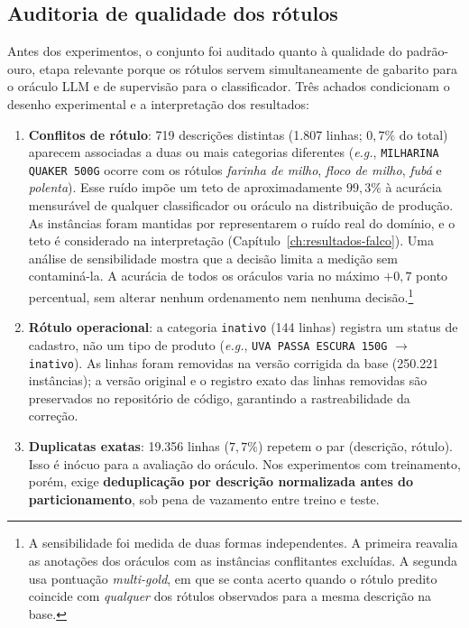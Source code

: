 \subsection{Auditoria de qualidade dos rótulos}
\label{sec:metodo-dados-auditoria}

Antes dos experimentos, o conjunto foi auditado quanto à qualidade do padrão-ouro, etapa
relevante porque os rótulos servem simultaneamente de gabarito para o oráculo
LLM e de supervisão para o classificador. Três achados condicionam o
desenho experimental e a interpretação dos resultados:

\begin{enumerate}
  \item \textbf{Conflitos de rótulo}: 719 descrições distintas (1.807 linhas;
  $0{,}7\%$ do total) aparecem associadas a duas ou mais categorias diferentes
  (\textit{e.g.}, \texttt{MILHARINA QUAKER 500G} ocorre com os rótulos
  \textit{farinha de milho}, \textit{floco de milho}, \textit{fubá} e
  \textit{polenta}). Esse ruído impõe um teto de aproximadamente $99{,}3\%$ à
  acurácia mensurável de qualquer classificador ou oráculo na distribuição de
  produção. As instâncias foram mantidas por representarem o ruído real do
  domínio, e o teto é considerado na interpretação
  (Capítulo~\ref{ch:resultados-falco}). Uma análise de sensibilidade mostra que a
  decisão limita a medição sem contaminá-la. A acurácia de todos os oráculos
  varia no máximo $+0{,}7$ ponto percentual, sem alterar nenhum ordenamento nem
  nenhuma decisão.\footnote{A sensibilidade foi medida de duas formas
  independentes. A primeira reavalia as anotações dos oráculos com as
  instâncias conflitantes excluídas. A segunda usa pontuação
  \emph{multi-gold}, em que se conta acerto quando o rótulo predito coincide
  com \emph{qualquer} dos rótulos observados para a mesma descrição na base.}
  \item \textbf{Rótulo operacional}: a categoria \texttt{inativo} (144 linhas)
  registra um status de cadastro, não um tipo de produto (\textit{e.g.},
  \texttt{UVA PASSA ESCURA 150G} $\rightarrow$ \texttt{inativo}). As linhas foram
  removidas na versão corrigida da base (250.221 instâncias); a versão original e
  o registro exato das linhas removidas são preservados no repositório de código,
  garantindo a rastreabilidade da correção.
  \item \textbf{Duplicatas exatas}: 19.356 linhas ($7{,}7\%$) repetem o par
  (descrição, rótulo). Isso é inócuo para a avaliação do oráculo. Nos
  experimentos com treinamento, porém, exige \textbf{deduplicação por
  descrição normalizada antes do particionamento}, sob pena de vazamento entre
  treino e teste.
\end{enumerate}

